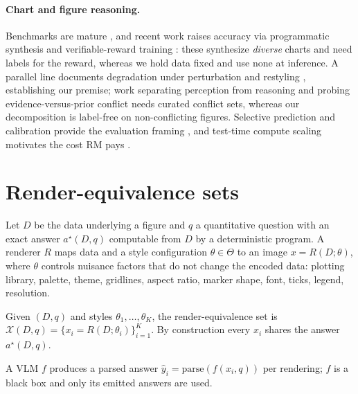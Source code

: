 \documentclass[11pt]{article}
\newcommand{\rmg}{\mathrm{RM}}
\begin{document}
\paragraph{Chart and figure reasoning.} Benchmarks are mature \citep{kahou2017figureqa,methani2020plotqa,masry2022chartqa}, and recent work raises accuracy via programmatic synthesis and verifiable-reward training \citep{liu2026chartverse,zhang2026chartrl,sinha2025chartrvr,kondic2025chartgen}: these synthesize \emph{diverse} charts and need labels for the reward, whereas we hold data fixed and use none at inference. A parallel line documents degradation under perturbation and restyling \citep{mukhopadhyay2024robustcqa,shin2025losingplot,zhao2026robustcot}, establishing our premise; work separating perception from reasoning \citep{xiao2025perceptionr1} and probing evidence-versus-prior conflict \citep{wang2026vfat,chen2026cdhbench,singla2026seeorguess} needs curated conflict sets, whereas our decomposition is label-free on non-conflicting figures. Selective prediction and calibration provide the evaluation framing \citep{elyaniv2010foundations,guo2017calibration,srinivasan2024selective}, and test-time compute scaling motivates the cost $\rmg$ pays \citep{snell2024scaling}.

\section{Render-equivalence sets}
\label{sec:method}

Let $D$ be the data underlying a figure and $q$ a quantitative question with an exact answer $a^\star(D,q)$ computable from $D$ by a deterministic program. A renderer $R$ maps data and a style configuration $\theta \in \Theta$ to an image $x = R(D;\theta)$, where $\theta$ controls nuisance factors that do not change the encoded data: plotting library, palette, theme, gridlines, aspect ratio, marker shape, font, ticks, legend, resolution.

\begin{definition}
\label{def:renderset}
Given $(D,q)$ and styles $\theta_1,\dots,\theta_K$, the render-equivalence set is $\mathcal{X}(D,q) = \{x_i = R(D;\theta_i)\}_{i=1}^K$. By construction every $x_i$ shares the answer $a^\star(D,q)$.
\end{definition}

A VLM $f$ produces a parsed answer $\hat y_i = \mathrm{parse}(f(x_i,q))$ per rendering; $f$ is a black box and only its emitted answers are used.
\end{document}

